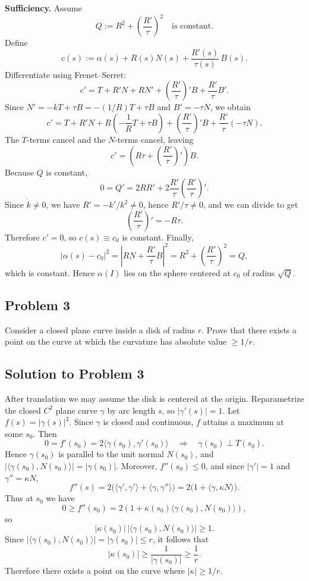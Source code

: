 \documentclass[12pt,a4paper]{article}
\theoremstyle{plain}
\theoremstyle{definition}      %
\begin{document}
	\medskip
	\noindent\textbf{Sufficiency.}
	Assume
	\[
	Q:=R^2+\left(\frac{R'}{\tau}\right)^2
	\quad\text{is constant.}
	\]
	Define
	\[
	c(s):=\alpha(s)+R(s)N(s)+\frac{R'(s)}{\tau(s)}\,B(s).
	\]
	Differentiate using Frenet--Serret:
	\[
	c' = T + R'N + R N' + \left(\frac{R'}{\tau}\right)'B + \frac{R'}{\tau}B'.
	\]
	Since $N'=-kT+\tau B=-(1/R)T+\tau B$ and $B'=-\tau N$, we obtain
	\[
	c' = T + R'N + R\left(-\frac1R T + \tau B\right) + \left(\frac{R'}{\tau}\right)'B + \frac{R'}{\tau}(-\tau N).
	\]
	The $T$-terms cancel and the $N$-terms cancel, leaving
	\[
	c'=\left(R\tau+\left(\frac{R'}{\tau}\right)'\right)B.
	\]
	Because $Q$ is constant,
	\[
	0=Q' = 2RR' + 2\frac{R'}{\tau}\left(\frac{R'}{\tau}\right)'.
	\]
	Since $\dot{k}\neq 0$, we have $R'=-k'/k^2\neq 0$, hence $R'/\tau\neq 0$, and we can divide to get
	\[
	\left(\frac{R'}{\tau}\right)'=-R\tau.
	\]
	Therefore $c'=0$, so $c(s)\equiv c_0$ is constant. Finally,
	\[
	|\alpha(s)-c_0|^2
	=\left|R N + \frac{R'}{\tau}B\right|^2
	=R^2+\left(\frac{R'}{\tau}\right)^2
	=Q,
	\]
	which is constant. Hence $\alpha(I)$ lies on the sphere centered at $c_0$ of radius $\sqrt{Q}$.
	
	\subsection*{Problem 3}
	Consider a closed plane curve inside a disk of radius $r$.
	Prove that there exists a point on the curve at which the curvature has absolute value $\ge 1/r$.
	
	\subsection*{Solution to Problem 3}
	
	After translation we may assume the disk is centered at the origin.
	Reparametrize the closed $C^2$ plane curve $\gamma$ by arc length $s$, so $|\gamma'(s)|=1$.
	Let $f(s)=|\gamma(s)|^2$. Since $\gamma$ is closed and continuous, $f$ attains a maximum at some $s_0$.
	Then
	\[
	0=f'(s_0)=2\langle \gamma(s_0),\gamma'(s_0)\rangle
	\quad\Longrightarrow\quad
	\gamma(s_0)\perp T(s_0).
	\]
	Hence $\gamma(s_0)$ is parallel to the unit normal $N(s_0)$, and $|\langle \gamma(s_0),N(s_0)\rangle|=|\gamma(s_0)|$.
	Moreover, $f''(s_0)\le 0$, and since $|\gamma'|=1$ and $\gamma''=\kappa N$,
	\[
	f''(s)=2\big(\langle \gamma',\gamma'\rangle + \langle \gamma,\gamma''\rangle\big)
	=2\big(1+\langle \gamma,\kappa N\rangle\big).
	\]
	Thus at $s_0$ we have
	\[
	0\ge f''(s_0)=2\left(1+\kappa(s_0)\langle \gamma(s_0),N(s_0)\rangle\right),
	\]
	so
	\[
	|\kappa(s_0)|\,|\langle \gamma(s_0),N(s_0)\rangle|\ge 1.
	\]
	Since $|\langle \gamma(s_0),N(s_0)\rangle|=|\gamma(s_0)|\le r$, it follows that
	\[
	|\kappa(s_0)|\ge \frac{1}{|\gamma(s_0)|}\ge \frac{1}{r}.
	\]
	Therefore there exists a point on the curve where $|\kappa|\ge 1/r$.
	
\end{document}
